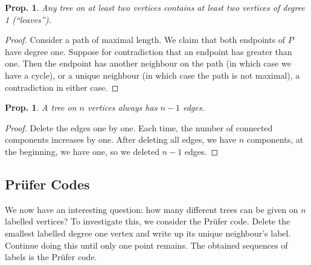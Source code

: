 \documentclass[12pt, a4paper]{book}
\newtheorem{proposition}[theorem]{Prop.}
\theoremstyle{nonumberplain}
\newtheorem{proof}{Proof}
\begin{document}
\begin{proposition}
    Any tree on at least two vertices contains at least two vertices of degree 1 (``leaves'').
\end{proposition}
\begin{proof}
    Consider a path of maximal length.
    We claim that both endpoints of $P$ have degree one.
    Suppose for contradiction that an endpoint has greater than one.
    Then the endpoint has another neighbour on the path (in which case we have a cycle), or a unique neighbour (in which case the path is not maximal), a contradiction in either case.
\end{proof}
\begin{proposition}
    A tree on $n$ vertices always has $n-1$ edges.
\end{proposition}
\begin{proof}
    Delete the edges one by one.
    Each time, the number of connected components increases by one.
    After deleting all edges, we have $n$ components, at the beginning, we have one, so we deleted $n-1$ edges.
\end{proof}
\subsection{Pr\"ufer Codes}
We now have an interesting question: how many different trees can be given on $n$ labelled vertices?
To investigate this, we consider the Pr{\"u}fer code. Delete the smallest labelled degree one vertex and write up its unique neighbour's label.
Continue doing this until only one point remains.
The obtained sequences of labels is the Pr\"ufer code.
\end{document}
